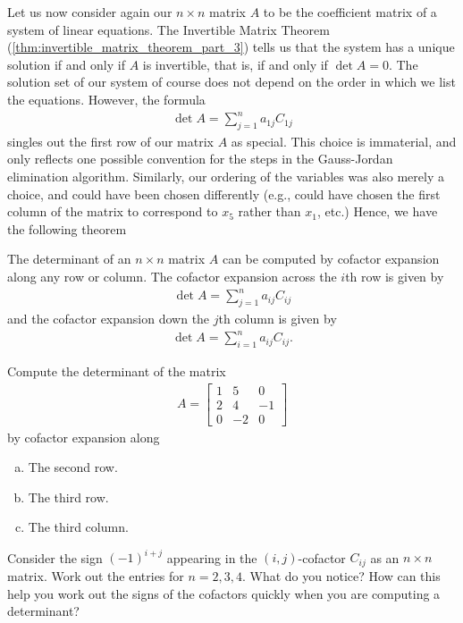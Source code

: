 \documentclass[12pt,letterpaper,reqno]{article}
\numberwithin{equation}{section}
\begin{document}
Let us now consider again our $n \times n$ matrix $A$ to be the coefficient matrix of a system of linear equations. The Invertible Matrix Theorem (\ref{thm:invertible_matrix_theorem_part_3}) tells us that the system has a unique solution if and only if $A$ is invertible, that is, if and only if $\det A=0$. The solution set of our system of course does not depend on the order in which we list the equations. However, the formula
\begin{align*}
	\det A=\sum_{j=1}^na_{1j}C_{1j}
\end{align*}
singles out the first row of our matrix $A$ as special. This choice is immaterial, and only reflects one possible convention for the steps in the Gauss-Jordan elimination algorithm. Similarly, our ordering of the variables was also merely a choice, and could have been chosen differently (e.g., could have chosen the first column of the matrix to correspond to $x_5$ rather than $x_1$, etc.) Hence, we have the following theorem
\begin{thm}
	The determinant of an $n \times n$ matrix $A$ can be computed by cofactor expansion along any row or column. The cofactor expansion across the $i$th row is given by
	\begin{align*}
		\det A=\sum_{j=1}^na_{ij}C_{ij}
	\end{align*}
	and the cofactor expansion down the $j$th column is given by
	\begin{align*}
		\det A=\sum_{i=1}^na_{ij}C_{ij}.
	\end{align*}
\end{thm}

\begin{exercise}
Compute the determinant of the matrix
\begin{align*}
	A=\begin{bmatrix}
		1 & 5 & 0 \\
		2 & 4 & -1 \\
		0 & -2 & 0
	\end{bmatrix}
\end{align*}
	by cofactor expansion along
	\begin{enumerate}[(a)]
		\item The second row.
		\item The third row.
		\item The third column.
	\end{enumerate}	
\end{exercise}

\begin{exercise}
Consider the sign $(-1)^{i+j}$ appearing in the $(i,j)$-cofactor $C_{ij}$ as an $n \times n$ matrix. Work out the entries for $n=2,3,4$. What do you notice? How can this help you work out the signs of the cofactors quickly when you are computing a determinant?	
\end{exercise}
\end{document}
